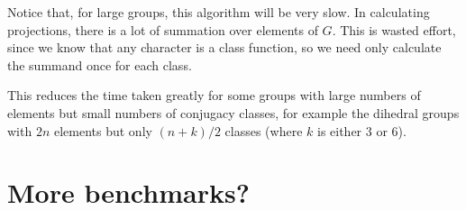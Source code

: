 \documentclass{article}
\begin{document}
Notice that, for large groups, this algorithm will be very slow. In
calculating projections, there is a lot of summation over elements of
$G$. This is wasted effort, since we know that any character is a
class function, so we need only calculate the summand once for each
class.

This reduces the time taken greatly for some groups with large numbers
of elements but small numbers of conjugacy classes, for example the
dihedral groups with $2n$ elements but only $(n+k)/2$ classes (where
$k$ is either 3 or 6).

\section{More benchmarks?}
\end{document}
